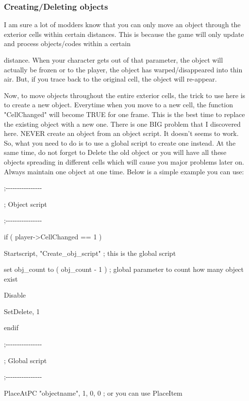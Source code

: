 \documentclass[
]{article}
\begin{document}
\hypertarget{creatingdeleting-objects}{%
\subsubsection{\texorpdfstring{Creating/Deleting objects
}{Creating/Deleting objects }}\label{creatingdeleting-objects}}

I am sure a lot of modders know that you can only move an object through
the exterior cells within certain distances. This is because the game
will only update and process objects/codes within a certain

distance. When your character gets out of that parameter, the object
will actually be frozen or to the player, the object has
warped/disappeared into thin air. But, if you trace back to the original
cell, the object will re-appear.

Now, to move objects throughout the entire exterior cells, the trick to
use here is to create a new object. Everytime when you move to a new
cell, the function "CellChanged" will become TRUE for one frame. This is
the best time to replace the existing object with a new one. There is
one BIG problem that I discovered here. NEVER create an object from an
object script. It doesn't seems to work. So, what you need to do is to
use a global script to create one instead. At the same time, do not
forget to Delete the old object or you will have all these objects
spreading in different cells which will cause you major problems later
on. Always maintain one object at one time. Below is a simple example
you can use:

;-\/-\/-\/-\/-\/-\/-\/-\/-\/-\/-\/-\/-\/-\/-\/-

; Object script

;-\/-\/-\/-\/-\/-\/-\/-\/-\/-\/-\/-\/-\/-\/-\/-

if ( player-\textgreater CellChanged == 1 )

Startscript, "Create\_obj\_script" ; this is the global script

set obj\_count to ( obj\_count - 1 ) ; global parameter to count how
many object exist

Disable

SetDelete, 1

endif

;-\/-\/-\/-\/-\/-\/-\/-\/-\/-\/-\/-\/-\/-\/-\/-

; Global script

;-\/-\/-\/-\/-\/-\/-\/-\/-\/-\/-\/-\/-\/-\/-\/-

PlaceAtPC "objectname", 1, 0, 0 ; or you can use PlaceItem
\end{document}
